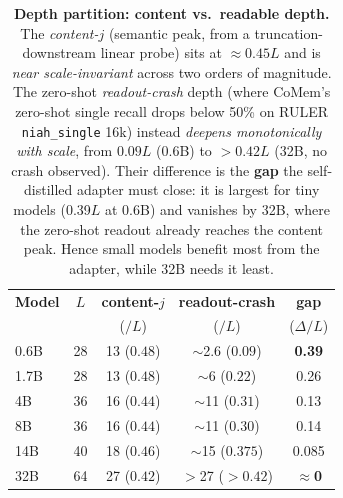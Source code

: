 \begin{table}[t]
\centering
\small
\setlength{\tabcolsep}{5pt}
\begin{tabular}{@{}lcccc@{}}
\toprule
\textbf{Model} & \textbf{$L$} & \textbf{content-$j$} & \textbf{readout-crash} & \textbf{gap} \\
 & & ($/L$) & ($/L$) & ($\Delta/L$) \\
\midrule
0.6B & 28 & 13 ($0.48$) & $\sim$2.6 ($0.09$) & \textbf{0.39} \\
1.7B & 28 & 13 ($0.48$) & $\sim$6 ($0.22$)  & 0.26 \\
4B   & 36 & 16 ($0.44$) & $\sim$11 ($0.31$) & 0.13 \\
8B   & 36 & 16 ($0.44$) & $\sim$11 ($0.30$) & 0.14 \\
14B  & 40 & 18 ($0.46$) & $\sim$15 ($0.375$) & 0.085 \\
32B  & 64 & 27 ($0.42$) & $>$27 ($>0.42$)   & \textbf{$\approx$0} \\
\bottomrule
\end{tabular}
\caption{\textbf{Depth partition: content vs.\ readable depth.} The
\emph{content-$j$} (semantic peak, from a truncation-downstream linear probe)
sits at $\approx$$0.45L$ and is \emph{near scale-invariant} across two orders of
magnitude. The zero-shot \emph{readout-crash} depth (where CoMem's zero-shot
single recall drops below 50\% on RULER \texttt{niah\_single} 16k) instead
\emph{deepens monotonically with scale}, from $0.09L$ (0.6B) to $>0.42L$ (32B,
no crash observed). Their difference is the \textbf{gap} the self-distilled
adapter must close: it is largest for tiny models (0.39$L$ at 0.6B) and vanishes
by 32B, where the zero-shot readout already reaches the content peak. Hence
small models benefit most from the adapter, while 32B needs it least.}
\label{tab:depth}
\end{table}

